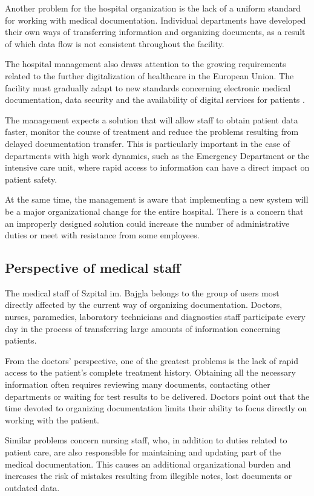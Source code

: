 Another problem for the hospital organization is the lack of a uniform standard for working with medical documentation. Individual departments have developed their own ways of transferring information and organizing documents, as a result of which data flow is not consistent throughout the facility.

The hospital management also draws attention to the growing requirements related to the further digitalization of healthcare in the European Union. The facility must gradually adapt to new standards concerning electronic medical documentation, data security and the availability of digital services for patients \cite{EU_eHealth_2024}.

The management expects a solution that will allow staff to obtain patient data faster, monitor the course of treatment and reduce the problems resulting from delayed documentation transfer. This is particularly important in the case of departments with high work dynamics, such as the Emergency Department or the intensive care unit, where rapid access to information can have a direct impact on patient safety.

At the same time, the management is aware that implementing a new system will be a major organizational change for the entire hospital. There is a concern that an improperly designed solution could increase the number of administrative duties or meet with resistance from some employees.
\subsection{Perspective of medical staff}
The medical staff of Szpital im. Bajgla belongs to the group of users most directly affected by the current way of organizing documentation. Doctors, nurses, paramedics, laboratory technicians and diagnostics staff participate every day in the process of transferring large amounts of information concerning patients.

From the doctors' perspective, one of the greatest problems is the lack of rapid access to the patient's complete treatment history. Obtaining all the necessary information often requires reviewing many documents, contacting other departments or waiting for test results to be delivered. Doctors point out that the time devoted to organizing documentation limits their ability to focus directly on working with the patient.

Similar problems concern nursing staff, who, in addition to duties related to patient care, are also responsible for maintaining and updating part of the medical documentation. This causes an additional organizational burden and increases the risk of mistakes resulting from illegible notes, lost documents or outdated data.

